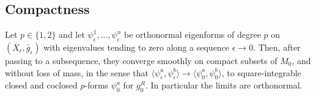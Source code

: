 \subsection{Compactness}
\begin{proposition}\label{prop:compactness}
Let $p\in\{1,2\}$ and let $\psi^1_\epsilon,\ldots,\psi^n_\epsilon$ be
orthonormal eigenforms of degree $p$ on $(\overline X_\epsilon,\bar
g_\epsilon)$ with eigenvalues tending to zero along a sequence
$\epsilon\to0$. Then, after passing to a subsequence, they converge
smoothly on compact subsets of $M_0$, and without loss of mass, in the sense that
$\langle\psi^a_\epsilon,\psi^b_\epsilon\rangle\to\langle\psi^a_0,
\psi^b_0\rangle$, to square-integrable closed and coclosed $p$-forms
$\psi^a_0$ for $g_0^R$. In particular the limits are orthonormal.
\end{proposition}
